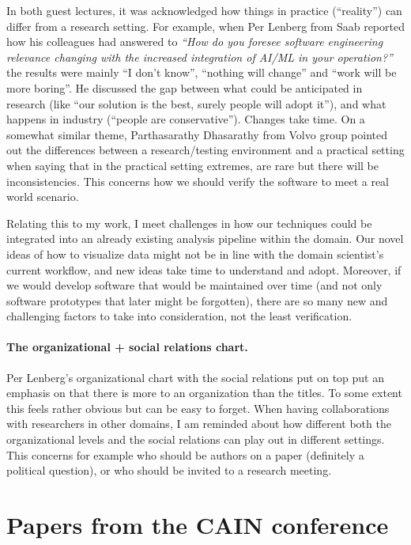\documentclass[11pt]{article}
\begin{document}
In both guest lectures, it was acknowledged how things in practice (``reality'') can differ from a research setting.
For example, when Per Lenberg from Saab reported how his colleagues had answered to \textit{``How do you foresee software engineering relevance changing with the increased integration of AI/ML in your operation?''} the results were mainly ``I don't know'', ``nothing will change'' and ``work will be more boring''. He discussed the gap between what could be anticipated in research (like ``our solution is the best, surely people will adopt it''), and what happens in industry (``people are conservative''). Changes take time.
On a somewhat similar theme, Parthasarathy Dhasarathy from Volvo group pointed out the differences between a research/testing environment and a practical setting when saying that in the practical setting extremes, are rare but there will be inconsistencies. This concerns how we should verify the software to meet a real world scenario.

Relating this to my work, I meet challenges in how our techniques could be integrated into an already existing analysis pipeline within the domain. 
Our novel ideas of how to visualize data might not be in line with the domain scientist's current workflow, and new ideas take time to understand and adopt.
Moreover, if we would develop software that would be maintained over time (and not only software prototypes that later might be forgotten), there are so many new and challenging factors to take into consideration, not the least verification.

\paragraph*{The organizational + social relations chart.}

Per Lenberg's organizational chart with the social relations put on top put an emphasis on that there is more to an organization than the titles. 
To some extent this feels rather obvious but can be easy to forget.
When having collaborations with researchers in other domains, I am reminded about how different both the organizational levels and the social relations can play out in different settings. This concerns for example who should be authors on a paper (definitely a political question), or who should be invited to a research meeting. 



\section{Papers from the CAIN conference}
\end{document}
